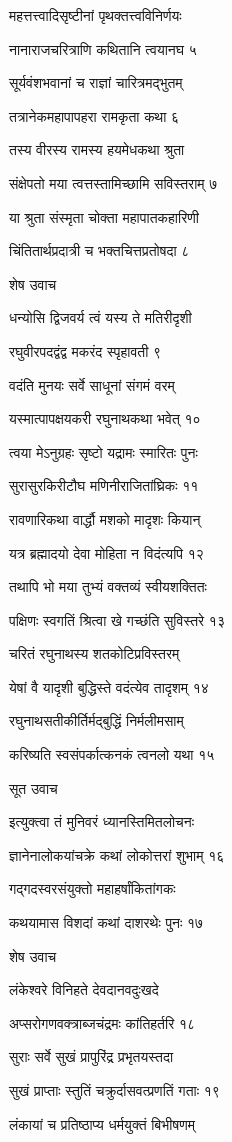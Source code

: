 महत्तत्त्वादिसृष्टीनां पृथक्तत्त्वविनिर्णयः

नानाराजचरित्राणि कथितानि त्वयानघ ५

सूर्यवंशभवानां च राज्ञां चारित्रमद्भुतम्

तत्रानेकमहापापहरा रामकृता कथा ६

तस्य वीरस्य रामस्य हयमेधकथा श्रुता

संक्षेपतो मया त्वत्तस्तामिच्छामि सविस्तराम् ७

या श्रुता संस्मृता चोक्ता महापातकहारिणी

चिंतितार्थप्रदात्री च भक्तचित्तप्रतोषदा ८

शेष उवाच

धन्योसि द्विजवर्य त्वं यस्य ते मतिरीदृशी

रघुवीरपदद्वंद्व मकरंद स्पृहावती ९

वदंति मुनयः सर्वे साधूनां संगमं वरम्

यस्मात्पापक्षयकरी रघुनाथकथा भवेत् १०

त्वया मेऽनुग्रहः सृष्टो यद्रामः स्मारितः पुनः

सुरासुरकिरीटौघ मणिनीराजितांघ्रिकः ११

रावणारिकथा वार्द्धौ मशको मादृशः कियान्

यत्र ब्रह्मादयो देवा मोहिता न विदंत्यपि १२

तथापि भो मया तुभ्यं वक्तव्यं स्वीयशक्तितः

पक्षिणः स्वगतिं श्रित्वा खे गच्छंति सुविस्तरे १३

चरितं रघुनाथस्य शतकोटिप्रविस्तरम्

येषां वै यादृशी बुद्धिस्ते वदंत्येव तादृशम् १४

रघुनाथसतीकीर्तिर्मद्बुद्धिं निर्मलीमसाम्

करिष्यति स्वसंपर्कात्कनकं त्वनलो यथा १५

सूत उवाच

इत्युक्त्वा तं मुनिवरं ध्यानस्तिमितलोचनः

ज्ञानेनालोकयांचक्रे कथां लोकोत्तरां शुभाम् १६

गद्गदस्वरसंयुक्तो महाहर्षांकितांगकः

कथयामास विशदां कथां दाशरथेः पुनः १७

शेष उवाच

लंकेश्वरे विनिहते देवदानवदुःखदे

अप्सरोगणवक्त्राब्जचंद्रमः कांतिहर्तरि १८

सुराः सर्वे सुखं प्रापुरिंद्र प्रभृतयस्तदा

सुखं प्राप्ताः स्तुतिं चक्रुर्दासवत्प्रणतिं गताः १९

लंकायां च प्रतिष्ठाप्य धर्मयुक्तं बिभीषणम्

